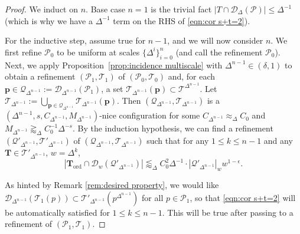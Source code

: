 \documentclass{amsart}
\newcommand{\T}{\mathcal{T}}
\newcommand{\bp}{\mathbf{p}}
\newcommand{\bT}{\mathbf{T}}
\newcommand{\cD}{\mathcal{D}}
\newcommand{\cT}{\mathcal{T}}
\newcommand{\cQ}{\mathcal{Q}}
\newcommand{\cP}{\mathcal{P}}
\newcommand{\ord}{\mathrm{ord}}
\begin{document}
\begin{proof}
    We induct on $n$. Base case $n = 1$ is the trivial fact $|T \cap \cD_{\Delta} (\cP)| \le \Delta^{-1}$ (which is why we have a $\Delta^{-1}$ term on the RHS of \eqref{eqn:cor s+t=2}).

    For the inductive step, assume true for $n-1$, and we will now consider $n$. We first refine $\cP_0$ to be uniform at scales $\{ \Delta^i \}_{i=0}^n$ (and call the refinement $\cP_0$). Next, we apply Proposition~\ref{prop:incidence multiscale} with $\Delta^{n-1}\in (\delta, 1)$ to obtain a refinement $(\cP_1, \cT_1)$ of $(\cP_0, \cT_0)$ and, for each $\bp \in \cQ_{\Delta^{n-1}} := \cD_{\Delta^{n-1}} (\cP_1)$, a set $\cT_{\Delta^{n-1}} (\bp) \subset \T^{\Delta^{n-1}}$. Let $\cT_{\Delta^{n-1}} := \bigcup_{\bp \in \cQ_{\Delta^{n-1}}} \T_{\Delta^{n-1}} (\bp)$. Then $(\cQ_{\Delta^{n-1}}, \cT_{\Delta^{n-1}})$ is a $(\Delta^{n-1}, s, C_{\Delta^{n-1}}, M_{\Delta^{n-1}})$-nice configuration for some $C_{\Delta^{n-1}}\approx_{\Delta} C_0$ and $M_{\Delta^{n-1}}\gtrapprox_{\Delta} C_0^{-1}\Delta^{-s}$. By the induction hypothesis, we can find a refinement $(\cQ'_{\Delta^{n-1}}, \cT'_{\Delta^{n-1}})$ of $(\cQ_{\Delta^{n-1}}, \cT_{\Delta^{n-1}})$ such that %
    for any $1 \le k \le n-1$ and any $\bT \in \cT'_{\Delta^{n-1}}$, $w = \Delta^k$,
    \begin{equation}\label{eqn:cor s+t=2 ind hyp}
        |\bT_\ord \cap \cD_w (\cQ'_{\Delta^{n-1}})| \lessapprox_{\Delta} C_0^2 \Delta^{-1} \cdot |\cQ'_{\Delta^{n-1}}|_w w^{1-\epsilon}.
    \end{equation}

As hinted by Remark \ref{rem:desired property}, we would like $\cD_{\Delta^{n-1}} (\cT_1 (p)) \subset \cT'_{\Delta^{n-1}} (p^{\Delta^{n-1}})$ for all $p \in \cP_1$, so that \eqref{eqn:cor s+t=2} will be automatically satisfied for $1 \le k \le n-1$. This will be true after passing to a refinement of $(\cP_1, \cT_1)$. 


\end{proof}
\end{document}
